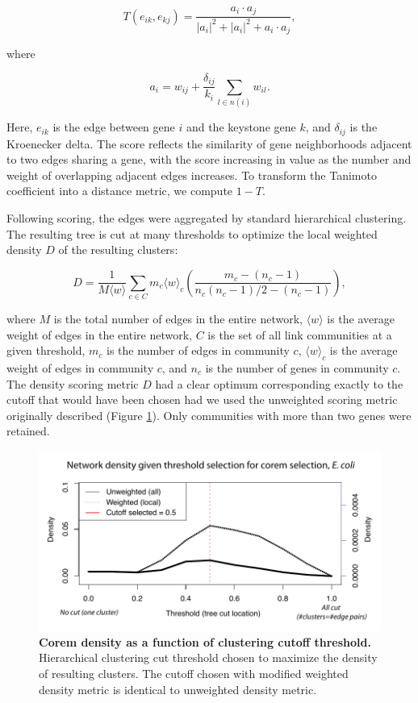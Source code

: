 \begin{equation}
T(e_{ik},e_{kj}) = \frac{a_i\cdot a_j}{|a_i|^2+|a_i|^2+a_i\cdot a_j},
\end{equation}

\noindent where

\begin{equation}
a_i=w_{ij}+\frac{\delta_{ij}}{k_i}\sum_{l\in n(i)}w_{il}.
\end{equation}

\noindent Here, $e_{ik}$ is the edge between gene $i$ and the keystone gene $k$, and $\delta_{ij}$ is the Kroenecker delta. The score reflects the similarity of gene neighborhoods adjacent to two edges sharing a gene, with the score increasing in value as the number and weight of overlapping adjacent edges increases. To transform the Tanimoto coefficient into a distance metric, we compute $1-T$.

Following scoring, the edges were aggregated by standard hierarchical clustering. The resulting tree is cut at many thresholds to optimize the local weighted density $D$ of the resulting clusters:

\begin{equation}
D=\frac{1}{M\langle w\rangle}\sum_{c\in C}m_c\langle w\rangle_c\left(\frac{m_c-(n_c-1)}{n_c(n_c-1)/2-(n_c-1)}\right),
\end{equation}

\noindent where $M$ is the total number of edges in the entire network, $\langle w\rangle$ is the average weight of edges in the entire network, $C$ is the set of all link communities at a given threshold, $m_c$ is the number of edges in community $c$, $\langle w\rangle_c$ is the average weight of edges in community $c$, and $n_c$ is the number of genes in community $c$. The density scoring metric $D$ had a clear optimum corresponding exactly to the cutoff that would have been chosen had we used the unweighted scoring metric originally described (Figure \ref{fig:corem_density}). Only communities with more than two genes were retained.

\begin{figure}[h!]
\centering
\includegraphics[width=0.9\linewidth]{figures/corem_density.pdf}
\caption[Corem density as a function of clustering cutoff threshold]{{\bf Corem density as a function of clustering cutoff threshold.} Hierarchical clustering cut threshold chosen to maximize the density of resulting clusters. The cutoff chosen with modified weighted density metric is identical to unweighted density metric.} 
\label{fig:corem_density}
\end{figure}

